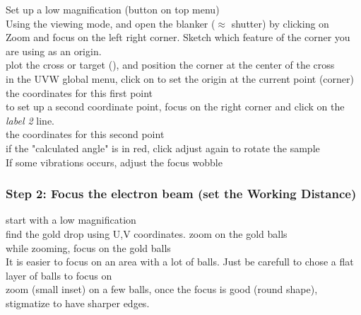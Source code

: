 \documentclass[12pt,a4paper]{report}
\begin{document}
\begin{enumerate}
Set up a low magnification (button on top menu)\\

Using the viewing mode, and open the blanker ($\approx$ shutter) by clicking on \\

Zoom and focus on the left right corner. Sketch which feature of the corner you are using as an origin.\\

plot the cross or target (), and position the corner at the center of the cross\\

in the UVW global menu, click on  to set the origin at the current point (corner)\\

 the coordinates for this first point\\

to set up a second coordinate point, focus on the right corner and click  on the \textit{label 2} line.\\

 the coordinates for this second point\\

if the "calculated angle" is in red, click adjust again to rotate the sample\\

If some vibrations occurs, adjust the focus wobble\\


\subsubsection{Step 2: Focus the electron beam (set the Working Distance)}

 start with a low magnification\\

find the gold drop using U,V coordinates.
zoom on the gold balls\\

while zooming, focus on the gold balls\\
It is easier to focus on an area with a lot of balls. Just be carefull to chose a flat layer of balls to focus on\\

zoom (small inset) on a few balls, once the focus is good (round shape), stigmatize to have sharper edges.\\


\end{enumerate}
\end{document}
